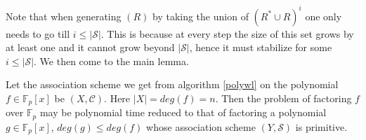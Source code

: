 	Note that when generating $(R)$ by taking the union of $(R^* \cup R)^i$ one only needs to go till $i \le |\mathcal{S}|$. This is because at every step the size of this set grows by at least one and it cannot grow beyond
	$|\mathcal{S}|$, hence it must stabilize for some $i \le |\mathcal{S}|$. We then come to the main lemma.

	\begin{theorem}\label{primitive}
		Let the association scheme we get from algorithm \ref{polywl} on the polynomial $f \in \mathbb{F}_p[x]$ be $(X,\mathcal{C})$. Here $|X|=deg(f)=n$. Then the problem of factoring $f$ over $\mathbb{F}_p$ may be 
		polynomial time reduced	to that of factoring a polynomial $g \in \mathbb{F}_p[x]$, $deg(g) \le deg(f)$ whose association scheme $(Y,\mathcal{S})$ is primitive.
	\end{theorem}

